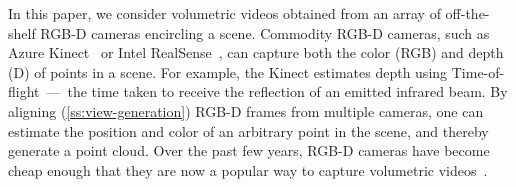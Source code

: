 In this paper, we consider volumetric videos obtained from an array of off-the-shelf RGB-D cameras encircling a scene. %
%
Commodity RGB-D cameras, such as Azure Kinect~\cite{kinect} or Intel RealSense~\cite{realsense}, can capture both the color (RGB) and depth (D) of points in a scene.
%
For example, the Kinect estimates depth using Time-of-flight~---~the time taken to receive the reflection of an emitted infrared beam.
%
By aligning (\cref{ss:view-generation}) RGB-D frames from multiple cameras, one can estimate the position and color of an arbitrary point in the scene, and thereby generate a point cloud.
%
Over the past few years, RGB-D cameras have become cheap enough that they are now a popular way to capture volumetric videos~\cite{depthkit}.

